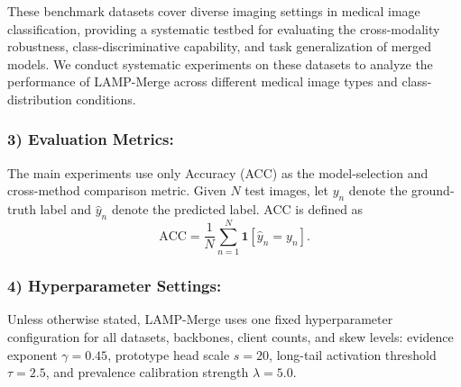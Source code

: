 \documentclass[letterpaper]{article} %
\begin{document}
These benchmark datasets cover diverse imaging settings in medical image classification, providing a systematic testbed for evaluating the cross-modality robustness, class-discriminative capability, and task generalization of merged models. We conduct systematic experiments on these datasets to analyze the performance of LAMP-Merge across different medical image types and class-distribution conditions.


\subsubsection{3) Evaluation Metrics:}
The main experiments use only Accuracy (ACC) as the model-selection and cross-method comparison metric. Given $N$ test images, let $y_n$ denote the ground-truth label and $\hat y_n$ denote the predicted label. ACC is defined as
\begin{equation}
\mathrm{ACC}=\frac{1}{N}\sum_{n=1}^{N}\mathbf{1}[\hat y_n=y_n].
\end{equation}

\subsubsection{4) Hyperparameter Settings:}

Unless otherwise stated, LAMP-Merge uses one fixed hyperparameter configuration for all datasets, backbones, client counts, and skew levels: evidence exponent $\gamma=0.45$, prototype head scale $s=20$, long-tail activation threshold $\tau=2.5$, and prevalence calibration strength $\lambda=5.0$. 
\end{document}
